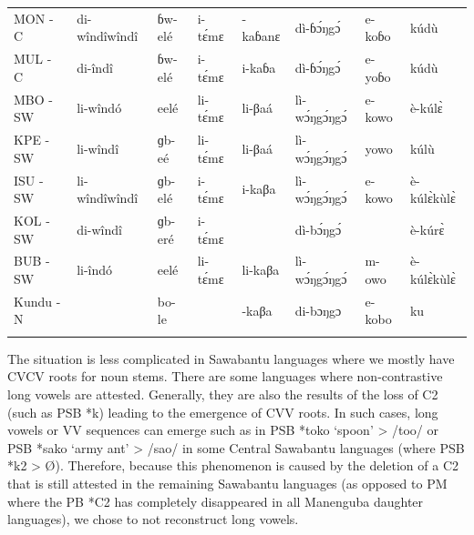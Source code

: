 \documentclass[output=paper,colorlinks,citecolor=brown
]{langscibook}
\begin{document}
\begin{table}[b]
{\begin{tabular}{llllllll}
MON - C                   & di-wîndîwîndî           & ɓw-elé                & i-tɛ́mɛ                 & -kaɓanɛ                  & dì-ɓɔ́ŋgɔ́            & e-koɓo                 & kúdù                   \\
MUL - C                   & di-îndî                 & ɓw-elé                & i-tɛ́mɛ                 & i-kaɓa                   & dì-ɓɔ́ŋgɔ́            & e-yoɓo                 & kúdù                   \\
MBO - SW                  & li-wîndó                & eelé                  & li-tɛ́mɛ                & li-βaá                  & lì-wɔ́ŋgɔ́ŋgɔ́        & e-kowo                 & è-kúlɛ̀                \\
KPE - SW                  & li-wîndî                & ɡb-eé                 & li-tɛ́mɛ                & li-βaá                  & lì-wɔ́ŋgɔ́ŋgɔ́        & yowo                   & kúlù                   \\
ISU - SW                  & li-wîndîwîndî           & ɡb-elé                & i-tɛ́mɛ                 & i-kaβa                   & lì-wɔ́ŋgɔ́ŋgɔ́        & e-kowo                 & è-kúlɛ̀kùlɛ̀          \\
KOL - SW                  & di-wîndî                & ɡb-eré                & i-tɛ́mɛ                 &                          & dì-bɔ́ŋgɔ́            &                        & è-kúrɛ̀                \\
BUB - SW                  & li-îndó                 & eelé                  & li-tɛ́mɛ                & li-kaβa                  & lì-wɔ́ŋgɔ́ŋgɔ́        & m-owo                  & è-kúlɛ̀kùlɛ̀          \\
Kundu - N                 &                         & bo-le                  &                         & -kaβa                    & di-bɔŋgɔ               & e-kobo                 & ku                           \\ 
   \lspbottomrule
 \end{tabular}
 }
\end{table}


The situation is less complicated in Sawabantu languages where we mostly have CVCV roots for noun stems. There are some languages where non-contrastive long vowels are attested. Generally, they are also the results of the loss of C2 (such as PSB *k) leading to the emergence of CVV roots. In such cases, long vowels or VV sequences can emerge such as in PSB *toko `spoon' > /too/ or PSB *sako `army ant' > /sao/ in some Central Sawabantu languages (where PSB *k2 > Ø). Therefore, because this phenomenon is caused by the deletion of a C2 that is still attested in the remaining Sawabantu languages (as opposed to PM where the PB *C2 has completely disappeared in all Manenguba daughter languages), we chose to not reconstruct long vowels.
\end{document}
